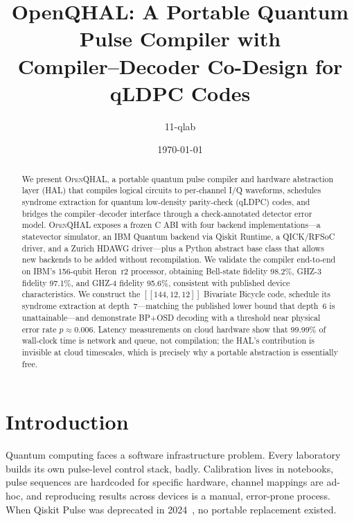 \documentclass[aps,prApplied,twocolumn,superscriptaddress,floatfix]{revtex4-2}
\begin{document}
\title{OpenQHAL: A Portable Quantum Pulse Compiler with\\
Compiler--Decoder Co-Design for qLDPC Codes}

\author{11-qlab}

\date{\today}

\begin{abstract}
We present \textsc{OpenQHAL}, a portable quantum pulse compiler and
hardware abstraction layer (HAL) that compiles logical circuits to
per-channel I/Q waveforms, schedules syndrome extraction for quantum
low-density parity-check (qLDPC) codes, and bridges the
compiler--decoder interface through a check-annotated detector error
model. \textsc{OpenQHAL} exposes a frozen C ABI with four backend
implementations---a statevector simulator, an IBM Quantum backend via
Qiskit Runtime, a QICK/RFSoC driver, and a Zurich HDAWG driver---plus a
Python abstract base class that allows new backends to be added without
recompilation. We validate the compiler end-to-end on IBM's
156-qubit Heron~r2 processor, obtaining Bell-state fidelity
\num{98.2}\%, GHZ-3 fidelity \num{97.1}\%, and GHZ-4 fidelity
\num{95.6}\%, consistent with published device characteristics. We
construct the $[[144,12,12]]$ Bivariate Bicycle code, schedule its
syndrome extraction at depth~7---matching the published lower bound
that depth~6 is unattainable---and demonstrate BP+OSD decoding with a
threshold near physical error rate $p \approx \num{0.006}$. Latency
measurements on cloud hardware show that \num{99.99}\% of wall-clock
time is network and queue, not compilation; the HAL's contribution is
invisible at cloud timescales, which is precisely why a portable
abstraction is essentially free.
\end{abstract}

\maketitle

\section{Introduction}
\label{sec:intro}

Quantum computing faces a software infrastructure problem. Every
laboratory builds its own pulse-level control stack, badly. Calibration
lives in notebooks, pulse sequences are hardcoded for specific hardware,
channel mappings are ad-hoc, and reproducing results across devices is a
manual, error-prone process. When Qiskit Pulse was deprecated in
2024~\cite{qiskit-pulse-deprecation}, no portable replacement existed.
\end{document}
